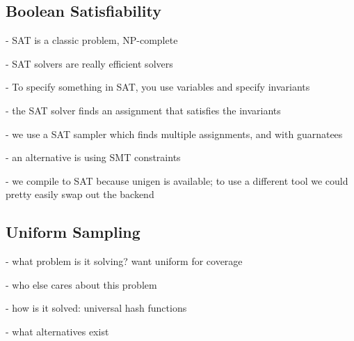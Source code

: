 \subsection{Boolean Satisfiability}

- SAT is a classic problem, NP-complete

- SAT solvers are really efficient solvers

- To specify something in SAT, you use variables and specify invariants

- the SAT solver finds an assignment that satisfies the invariants

- we use a SAT sampler which finds multiple assignments, and with guarnatees

- an alternative is using SMT constraints

- we compile to SAT because unigen is available; to use a different tool we could pretty easily swap out the backend

\cite{tseitin1983complexity}

\subsection{Uniform Sampling}

\cite{meel2016constrained}

- what problem is it solving? want uniform for coverage

- who else cares about this problem

- how is it solved: universal hash functions

- what alternatives exist
